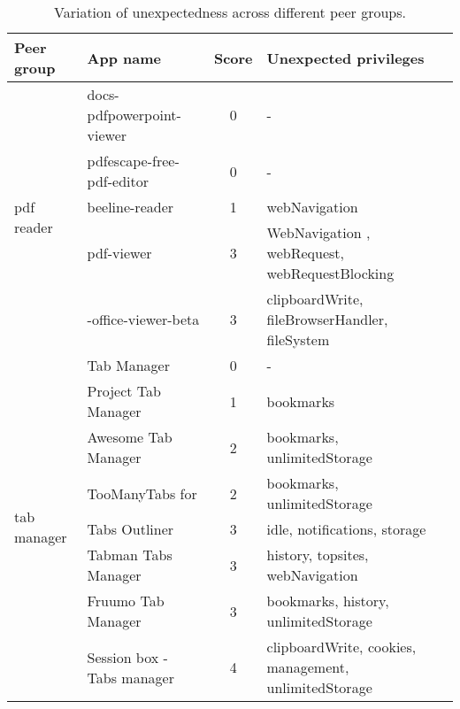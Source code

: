 \begin{table*}[!htbp]
        \begin{center}
        \caption{Variation of unexpectedness across different peer groups.  
                 \label{tbl:unexpected_chart}
                }
                \begin{scriptsize}
                \begin{tabular}{|l|l|c|l|}
                        \hline
                        Peer group & App name & Score & Unexpected privileges \\ \hline
                        \multirow{5}{*}{pdf reader} & docs-pdfpowerpoint-viewer & 0 & - \\ \cline{2-4}
                                             & pdfescape-free-pdf-editor & 0 & - \\ \cline{2-4}
                                             & beeline-reader & 1 & webNavigation \\ \cline{2-4}
                                             & pdf-viewer & 3 & WebNavigation , webRequest, webRequestBlocking \\ \cline{2-4}
                                             & \Chrome{}-office-viewer-beta & 3 & clipboardWrite, fileBrowserHandler, fileSystem \\     
                                             \hline \hline                                             
                       \multirow{8}{*}{tab manager} & Tab Manager & 0 & - \\ \cline{2-4}
                                             & Project Tab Manager & 1 & bookmarks \\ \cline{2-4}
                                             & Awesome Tab Manager & 2 & bookmarks, unlimitedStorage \\ \cline{2-4}
                                             & TooManyTabs for \Chrome{} & 2 & bookmarks, unlimitedStorage \\ \cline{2-4}
                                             & Tabs Outliner & 3 & idle, notifications, storage \\ \cline{2-4}
                                             & Tabman Tabs Manager & 3 & history, topsites, webNavigation \\ \cline{2-4}
                                             & Fruumo Tab Manager & 3 & bookmarks, history, unlimitedStorage \\ \cline{2-4}
                                             & Session box - Tabs manager & 4 & clipboardWrite, cookies, management, unlimitedStorage \\ \hline
                \end{tabular}
                \end{scriptsize}
        \end{center}
\end{table*}

